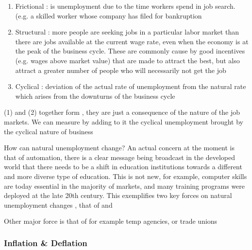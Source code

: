 \documentclass[english,course,draft]{Notes}
\begin{document}
{\begin{enumerate}
	\item Frictional : is
unemployment due to the time
workers spend in job search. (e.g. a skilled worker whose company has filed for bankruption
	\item Structural : more people are seeking jobs in a
particular labor market than there are
jobs available at the current wage
rate, even when the economy is at
the peak of the business cycle. These are commonly cause by good incentives (e.g. wages above market value) that are made to attract the best, but also attract a greater number of people who will necessarily not get the job 
	\item Cyclical : deviation of the actual rate of unemployment from the
natural rate which arises from the downturns of the business cycle
\end{enumerate}

\par{(1) and (2) together form , they are just a consequence of the nature of the job markets. We can measure  by adding to it the cyclical unemployment brought by the cyclical nature of business}




\par{How can natural unemployment change? An actual concern at the moment is that of automation, there is a clear message being broadcast in the developed world that there needs to be a shift in education institutions towards a different and more diverse type of education. This is not new, for example, computer skills are today essential in the majority of markets, and many training programs were deployed at the late 20th century. This exemplifies two key forces on natural unemployment changes , that of  and }
\par{Other major force is that of  for example temp agencies, or trade unions}

\subsubsection{Inflation \& Deflation}

}
\end{document}
